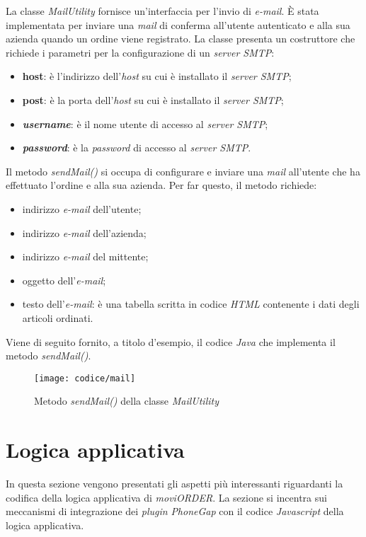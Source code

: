 La classe \textit{MailUtility} fornisce un'interfaccia per l'invio di \textit{e-mail}. È stata implementata per inviare una \textit{mail} di conferma all'utente autenticato e alla sua azienda quando un ordine viene registrato. La classe presenta un costruttore che richiede i parametri per la configurazione di un \textit{server SMTP}:
\begin{itemize}
	\item \textbf{host}: è l'indirizzo dell'\textit{host} su cui è installato il \textit{server SMTP};
	\item \textbf{post}: è la porta dell'\textit{host} su cui è installato il \textit{server SMTP};
	\item \textbf{\textit{username}}: è il nome utente di accesso al \textit{server SMTP};
	\item \textbf{\textit{password}}: è la \textit{password} di accesso al \textit{server SMTP}.
\end{itemize}
Il metodo \textit{sendMail()} si occupa di configurare e inviare una \textit{mail} all'utente che ha effettuato l'ordine e alla sua azienda. Per far questo, il metodo richiede:
\begin{itemize}
	\item indirizzo \textit{e-mail} dell'utente;
	\item indirizzo \textit{e-mail} dell'azienda;
	\item indirizzo \textit{e-mail} del mittente;
	\item oggetto dell'\textit{e-mail};
	\item testo dell'\textit{e-mail}: è una tabella scritta in codice \textit{HTML} contenente i dati degli articoli ordinati.
\end{itemize}
Viene di seguito fornito, a titolo d'esempio, il codice \textit{Java} che implementa il metodo \textit{sendMail()}.

\newpage

\begin{figure}[!h] 
    \centering 
    \texttt{[image: codice/mail]} 
    \caption{Metodo \textit{sendMail()} della classe \textit{MailUtility}}
\end{figure}
\section{Logica applicativa}

In questa sezione vengono presentati gli aspetti più interessanti riguardanti la codifica della logica applicativa di \textit{moviORDER}. La sezione si incentra sui meccanismi di integrazione dei \textit{plugin} \textit{PhoneGap} con il codice \textit{Javascript} della logica applicativa.

